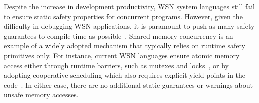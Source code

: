 \documentclass[letterpaper]{sig-alternate}
\begin{document}
Despite the increase in development productivity, WSN system languages still 
fail to ensure static safety properties for concurrent programs.
%
However, given the difficulty in debugging WSN applications, it is paramount to 
push as many safety guarantees to compile time as possible~\cite{wsn.decade}.
%
Shared-memory concurrency is an example of a widely adopted mechanism that 
typically relies on runtime safety primitives only.
For instance, current WSN languages ensure atomic memory access either through 
runtime barriers, such as mutexes and 
locks~\cite{wsn.mantisos,wsn.tinythreads}, or by adopting cooperative 
scheduling which also requires explicit yield points in the 
code~\cite{wsn.sol,wsn.protothreads}.
In either case, there are no additional static guarantees or warnings about 
unsafe memory accesses.
\end{document}
